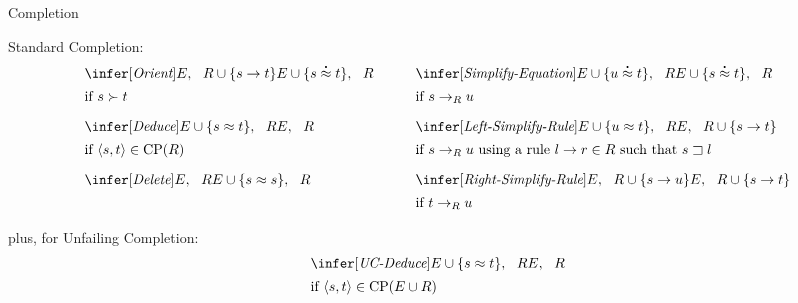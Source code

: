 \begin{entry}{Completion}


\newcommand{\deq}{\buildrel{\mbox{\Large.}}\over\approx}

\begin{calculus}


Standard Completion:
\[
\begin{array}{l@{\qquad}l}
\begin{array}{ll}
\infer[\textit{Orient}]
  {\strut E, \ \  R \cup \{ s \to t \}}
  {E \cup \{ s \deq t \}, \ \  R} \\
\mbox{if $s \succ t$\rule[-3ex]{0ex}{6ex}}
\end{array}
&
\begin{array}{ll}
\infer[\textit{Simplify-Equation}]
  {\strut E \cup \{ u \deq t \}, \ \  R}
  {E \cup \smash{\{ s \deq t \}}, \ \  R} \\
\mbox{if $s \to_R u$\rule[-3ex]{0ex}{6ex}}
\end{array}
\\
\begin{array}{ll}
\infer[\textit{Deduce}]
  {\strut E \cup \{ s \approx t \}, \ \  R}
  {E, \ \  R} \\
\mbox{if $\langle s,t \rangle \in \mathrm{CP}(R)$\rule[-3ex]{0ex}{6ex}}
\end{array}
&
\begin{array}{ll}
\infer[\textit{Left-Simplify-Rule}]
  {\strut E \cup \{ u \approx t \}, \ \  R}
  {E, \ \  R \cup \{ s \to t \}} \\
\mbox{if $s \to_R u$ using a rule $l \to r \in R$ such that $s \sqsupset l$\rule[-3ex]{0ex}{6ex}}
\end{array}
\\
\begin{array}{ll}
\infer[\textit{Delete}]
  {\strut E, \ \  R}
  {E \cup \{ s \approx s \}, \ \  R} \\
\mbox{\rule[-3ex]{0ex}{4ex}}
\end{array}
&
\begin{array}{ll}
\infer[\textit{Right-Simplify-Rule}]
  {\strut E, \ \  R \cup \{ s \to u \}}
  {E, \ \  R \cup \{ s \to t \}} \\
\mbox{if $t \to_R u$\rule[-2ex]{0ex}{5ex}}
\end{array}
\end{array}
\]
plus, for Unfailing Completion:
\[
\begin{array}{ll}
\infer[\textit{UC-Deduce}]
  {\strut E \cup \{ s \approx t \}, \ \  R}
  {E, \ \  R} \\
\mbox{if $\langle s,t \rangle \in \mathrm{CP}(E \cup R)$\rule[-3ex]{0ex}{6ex}}
\end{array}
\]


\end{calculus}
\end{entry}
